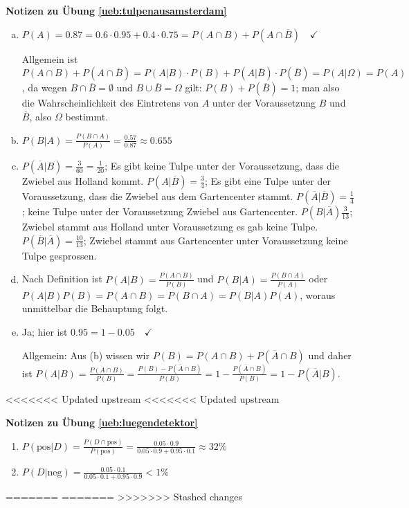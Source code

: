 \documentclass[%
<<<<<<< Updated upstream
<<<<<<< Updated upstream
11pt,%
twoside,%
titlepage,%
german,%
=======
=======
>>>>>>> Stashed changes
11pt,%
twoside,%
titlepage,%
swissgerman,%
<<<<<<< Updated upstream
>>>>>>> Stashed changes
=======
>>>>>>> Stashed changes
headsepline%
]{scrartcl}
\newcommand{\faReturnGray}{\textcolor{gray}{\faMailReply}} %
\theoremstyle{definition}
\theoremstyle{plain}
\newcommand{\concatueb}[1]{ueb:#1}%
\newcommand{\concatlsg}[1]{lsg:#1}%
\newenvironment{lsg}[1]{%
    \par\noindent\textbf{Notizen zu Übung \ref{\concatueb{#1}}}\label{\concatlsg{#1}}
    \hfill\hyperref[\concatueb{#1}]{\faReturnGray}\par %
}{%
    \par%
}
\newcommand{\concatueb}[1]{ueb:#1}%
\newcommand{\concatlsg}[1]{lsg:#1}%
\newenvironment{lsg}[1]{%
    \par\noindent\textbf{Notizen zu Übung \ref{\concatueb{#1}}.}%
    \label{\concatlsg{#1}}
}{%
    \par%
}
\begin{document}
\begin{lsg}{tulpenausamsterdam}
    \begin{enumerate}[a)]
        \item $P(A)=0.87=0.6\cdot0.95+0.4\cdot0.75=P(A\cap B)+P(A\cap\overline{B})\quad\checkmark$
        
        Allgemein ist $P(A\cap B)+P(A\cap\overline{B})=P(A|B)\cdot P(B)+P(A|\overline{B})\cdot P(\overline{B})=P(A|\Omega)=P(A)$, da wegen $B\cap\overline{B}=\emptyset$ und $B\cup\overline{B}=\Omega$ gilt: $P(B)+P(\overline{B})=1$; man also die Wahrscheinlichkeit des Eintretens von $A$ unter der Voraussetzung $B$ und $\overline{B}$, also $\Omega$ bestimmt.
        \item $P(B|A)=\frac{P(B\cap A)}{P(A)}=\frac{0.57}{0.87}\approx0.655$
        \item $P(\overline{A}|B)=\frac{3}{60}=\frac{1}{20}$; Es gibt keine Tulpe unter der Voraussetzung, dass die Zwiebel aus Holland kommt. $P(A|\overline{B})=\frac{3}{4}$; Es gibt eine Tulpe unter der Voraussetzung, dass die Zwiebel aus dem Gartencenter stammt. $P(\overline{A}|\overline{B})=\frac{1}{4}$; keine Tulpe unter der Voraussetzung Zwiebel aus Gartencenter. $P(B|\overline{A})\frac{3}{13}$; Zwiebel stammt aus Holland unter Voraussetzung es gab keine Tulpe. $P(\overline{B}|\overline{A})=\frac{10}{13}$; Zwiebel stammt aus Gartencenter unter Voraussetzung keine Tulpe gesprossen.
        \item Nach Definition ist $P(A|B)=\frac{P(A\cap B)}{P(B)}$ und $P(B|A)=\frac{P(B\cap A)}{P(A)}$ oder $P(A|B)P(B)=P(A\cap B)=P(B\cap A)=P(B|A)P(A)$, woraus unmittelbar die Behauptung folgt.
        \item Ja; hier ist $0.95=1-0.05\quad\checkmark$
        
        Allgemein: Aus (b) wissen wir $P(B)=P(A\cap B)+P(\overline{A}\cap B)$ und daher ist $P(A|B)=\frac{P(A\cap B)}{P(B)}=\frac{P(B)-P(\overline{A}\cap B)}{P(B)}=1-\frac{P(\overline{A}\cap B)}{P(B)}=1-P(\overline{A}|B)$.
    \end{enumerate}
\end{lsg}
<<<<<<< Updated upstream
<<<<<<< Updated upstream
\begin{lsg}{luegendetektor}
    \begin{enumerate}
        \item $P(\text{pos}|D)=\frac{P(D\cap\text{pos})}{P(\text{pos})}=\frac{0.05\cdot 0.9}{0.05\cdot0.9+0.95\cdot0.1}\approx32\%$
        \item $P(D|\text{neg})=\frac{0.05\cdot0.1}{0.05\cdot0.1+0.95\cdot0.9}<1\%$
    \end{enumerate}
\end{lsg}
=======
=======
>>>>>>> Stashed changes
\end{document}
